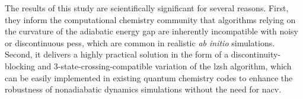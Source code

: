 The results of this study are scientifically significant for several reasons. First, they inform the computational chemistry community that algorithms relying on the curvature of the adiabatic energy gap are inherently incompatible with noisy or discontinuous \glspl{pes}, which are common in realistic \textit{ab initio} simulations. Second, it delivers a highly practical solution in the form of a discontinuity-blocking and 3-state-crossing-compatible variation of the \acrshort{lzsh} algorithm, which can be easily implemented in existing quantum chemistry codes to enhance the robustness of nonadiabatic dynamics simulations without the need for \acrshort{nacv}.
